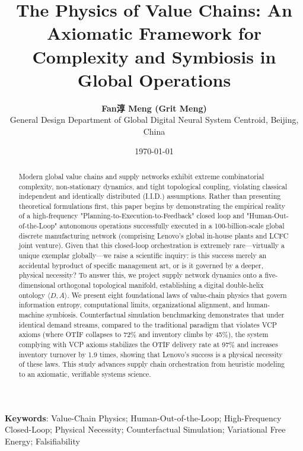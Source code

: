 \documentclass[11pt,a4paper]{article}
\title{\textbf{The Physics of Value Chains: An Axiomatic Framework for Complexity and Symbiosis in Global Operations}}
\author{\textbf{Fan淳 Meng (Grit Meng)} \\ General Design Department of Global Digital Neural System Centroid, Beijing, China}
\date{\today}
\begin{document}
\maketitle

\begin{abstract}
Modern global value chains and supply networks exhibit extreme combinatorial complexity, non-stationary dynamics, and tight topological coupling, violating classical independent and identically distributed (I.I.D.) assumptions. Rather than presenting theoretical formulations first, this paper begins by demonstrating the empirical reality of a high-frequency "Planning-to-Execution-to-Feedback" closed loop and "Human-Out-of-the-Loop" autonomous operations successfully executed in a 100-billion-scale global discrete manufacturing network (comprising Lenovo's global in-house plants and LCFC joint venture). Given that this closed-loop orchestration is extremely rare—virtually a unique exemplar globally—we raise a scientific inquiry: is this success merely an accidental byproduct of specific management art, or is it governed by a deeper, physical necessity? To answer this, we project supply network dynamics onto a five-dimensional orthogonal topological manifold, establishing a digital double-helix ontology $\langle D, A \rangle$. We present eight foundational laws of value-chain physics that govern information entropy, computational limits, organizational alignment, and human-machine symbiosis. Counterfactual simulation benchmarking demonstrates that under identical demand streams, compared to the traditional paradigm that violates VCP axioms (where OTIF collapses to 72\% and inventory climbs by 45\%), the system complying with VCP axioms stabilizes the OTIF delivery rate at 97\% and increases inventory turnover by 1.9 times, showing that Lenovo's success is a physical necessity of these laws. This study advances supply chain orchestration from heuristic modeling to an axiomatic, verifiable systems science.
\end{abstract}

\textbf{Keywords}: Value-Chain Physics; Human-Out-of-the-Loop; High-Frequency Closed-Loop; Physical Necessity; Counterfactual Simulation; Variational Free Energy; Falsifiability

\newpage
\end{document}
